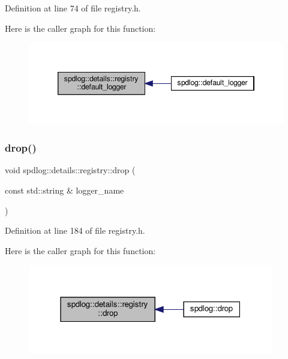 Definition at line 74 of file registry.\+h.

Here is the caller graph for this function\+:
\nopagebreak
\begin{figure}[H]
\begin{center}
\leavevmode
\includegraphics[width=346pt]{classspdlog_1_1details_1_1registry_af6c1f16e0433b6400aef5219fa1b81ea_icgraph}
\end{center}
\end{figure}
\mbox{\label{classspdlog_1_1details_1_1registry_a21f513aa5a7da6a21fe35a5077b2db74}} 
\subsubsection{\texorpdfstring{drop()}{drop()}}
{\footnotesize\ttfamily void spdlog\+::details\+::registry\+::drop (\begin{DoxyParamCaption}\item[{const std\+::string \&}]{logger\+\_\+name }\end{DoxyParamCaption})\hspace{0.3cm}{\ttfamily [inline]}}



Definition at line 184 of file registry.\+h.

Here is the caller graph for this function\+:
\nopagebreak
\begin{figure}[H]
\begin{center}
\leavevmode
\includegraphics[width=304pt]{classspdlog_1_1details_1_1registry_a21f513aa5a7da6a21fe35a5077b2db74_icgraph}
\end{center}
\end{figure}
\mbox{\label{classspdlog_1_1details_1_1registry_a127ccc3786f6ddef57f16d354ba4db91}} 

